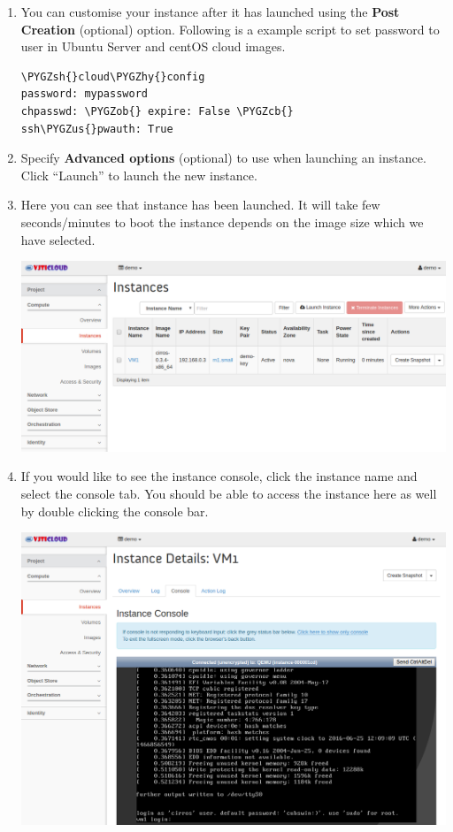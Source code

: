\documentclass[letterpaper,10pt,english]{sphinxmanual}
\def\PYGZus{\char`\_}
\def\PYGZob{\char`\{}
\def\PYGZcb{\char`\}}
\def\PYGZsh{\char`\#}
\def\PYGZhy{\char`\-}
\begin{document}
\begin{enumerate}
\item {} 
You can customise your instance after it has launched using the \textbf{Post Creation} (optional) option. Following is a example script to set password to user in Ubuntu Server and centOS cloud images.

\begin{Verbatim}[commandchars=\\\{\}]
\PYGZsh{}cloud\PYGZhy{}config
password: mypassword
chpasswd: \PYGZob{} expire: False \PYGZcb{}
ssh\PYGZus{}pwauth: True
\end{Verbatim}

\item {} 
Specify \textbf{Advanced options} (optional) to use when launching an instance. Click “Launch” to launch the new instance.

\item {} 
Here you can see that instance has been launched. It will take few seconds/minutes to boot the instance depends on the image size which we have selected.

\includegraphics{instances-launch-running.png}

\item {} 
If you would like to see the instance console, click the instance name and select the console tab. You should be able to access the instance here as well by double clicking the console bar.

\includegraphics{instances-launch-console.png}


\end{enumerate}
\end{document}
